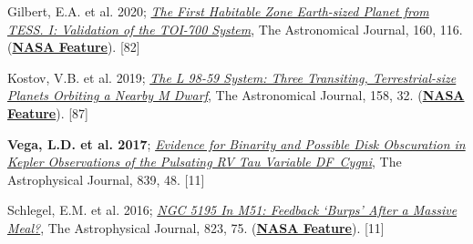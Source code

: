 \documentclass[letter,11pt]{article}
\begin{document}
\begin{etaremune}
\item Gilbert, E.A. et al. 2020; \href{https://ui.adsabs.harvard.edu/abs/2020AJ....160..116G/abstract}{\it The First Habitable Zone Earth-sized Planet from TESS. I: Validation of the TOI-700 System}, The Astronomical Journal, 160, 116.
(\href{https://www.nasa.gov/feature/goddard/2020/nasa-planet-hunter-finds-its-1st-earth-size-habitable-zone-world}{\bf NASA Feature}). [82]

\item Kostov, V.B. et al. 2019; \href{https://ui.adsabs.harvard.edu/abs/2019AJ....158...32K/abstract}{{\it The L 98-59 System: Three Transiting, Terrestrial-size Planets Orbiting a Nearby M Dwarf}}, The Astronomical Journal, 158, 32.
(\href{https://www.nasa.gov/feature/goddard/2019/nasa-s-tess-mission-finds-its-smallest-planet-yet}{\bf NASA Feature}). [87]

\item {\bf Vega, L.D. et al. 2017}; \href{https://ui.adsabs.harvard.edu/abs/2017ApJ...839...48V/abstract}{{\it Evidence for Binarity and Possible Disk Obscuration in Kepler Observations of the Pulsating RV Tau Variable DF~Cygni}}, The Astrophysical Journal, 839, 48. [11]

\item Schlegel, E.M. et al. 2016; \href{https://ui.adsabs.harvard.edu/abs/2016ApJ...823...75S/abstract}{{\it NGC 5195 In M51: Feedback ‘Burps’ After a Massive Meal?}}, The Astrophysical Journal, 823, 75. (\href{https://www.nasa.gov/mission_pages/chandra/nasa-s-chandra-finds-supermassive-black-hole-burping-nearby.html}{\bf NASA Feature}). [11]

\end{etaremune}

\end{document}

